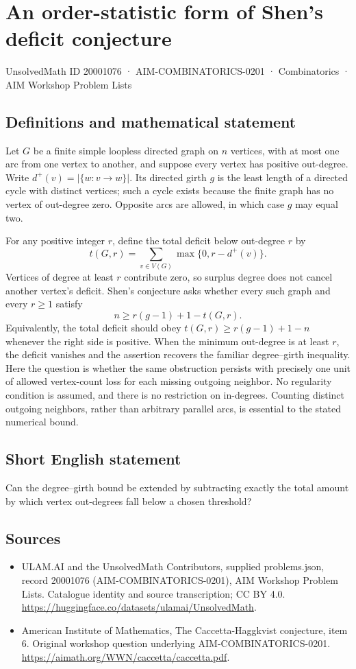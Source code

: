 \documentclass[11pt,a4paper]{article}
\begin{document}
\section*{An order-statistic form of Shen's deficit conjecture}\label{20001076}
{\small UnsolvedMath ID 20001076 · AIM-COMBINATORICS-0201 · Combinatorics · AIM Workshop Problem Lists}
\subsection{Definitions and mathematical statement}
Let $G$ be a finite simple loopless directed graph on $n$ vertices, with at most one arc from one vertex to another, and suppose every vertex has positive out-degree.
Write $d^+(v)=|\{w:v\to w\}|$.
Its directed girth $g$ is the least length of a directed cycle with distinct vertices; such a cycle exists because the finite graph has no vertex of out-degree zero.
Opposite arcs are allowed, in which case $g$ may equal two.

For any positive integer $r$, define the total deficit below out-degree $r$ by
\[
 t(G,r)=\sum_{v\in V(G)}\max\{0,r-d^+(v)\}.
\]
Vertices of degree at least $r$ contribute zero, so surplus degree does not cancel another vertex's deficit.
Shen's conjecture asks whether every such graph and every $r\geq1$ satisfy
\[
 n\geq r(g-1)+1-t(G,r).
\]
Equivalently, the total deficit should obey
$t(G,r)\geq r(g-1)+1-n$ whenever the right side is positive.
When the minimum out-degree is at least $r$, the deficit vanishes and the assertion recovers the familiar degree--girth inequality.
Here the question is whether the same obstruction persists with precisely one unit of allowed vertex-count loss for each missing outgoing neighbor.
No regularity condition is assumed, and there is no restriction on in-degrees.
Counting distinct outgoing neighbors, rather than arbitrary parallel arcs, is essential to the stated numerical bound.
\subsection{Short English statement}
Can the degree--girth bound be extended by subtracting exactly the total amount by which vertex out-degrees fall below a chosen threshold?
\subsection{Sources}
\begin{itemize}
\item[S1] ULAM.AI and the UnsolvedMath Contributors, supplied problems.json, record 20001076 (AIM-COMBINATORICS-0201), AIM Workshop Problem Lists. Catalogue identity and source transcription; CC BY 4.0.
\url{https://huggingface.co/datasets/ulamai/UnsolvedMath}.
\item[S2] American Institute of Mathematics, The Caccetta-Haggkvist conjecture, item 6. Original workshop question underlying AIM-COMBINATORICS-0201.
\url{https://aimath.org/WWN/caccetta/caccetta.pdf}.
\end{itemize}
\end{document}
